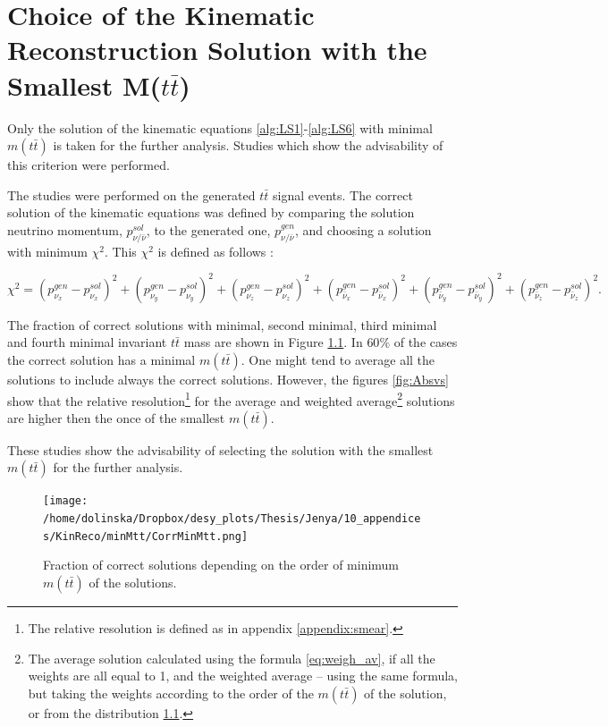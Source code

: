 \chapter{Choice of the Kinematic Reconstruction Solution with the Smallest M($t\bar{t}$)}\label{appendix:mtt}

Only the solution of the kinematic equations \ref{alg:LS1}-\ref{alg:LS6} with minimal $m(t\bar{t})$ is taken for the further analysis.
Studies which show the advisability of this criterion were performed.

The studies were performed on the generated $t\bar{t}$ signal events. The correct solution of the kinematic equations was defined by comparing the 
solution neutrino momentum, $p_{\nu/\bar{\nu}}^{sol}$, to the generated one, $p_{\nu/\bar{\nu}}^{gen}$,  and choosing a solution with minimum $\chi^{2}$.
This $\chi^{2}$ is defined as follows \cite{Sonnenschein:2005ed}:

\begin{equation}
 \chi^{2} = (p_{\nu_{x}}^{gen} - p_{\nu_{x}}^{sol})^{2} + (p_{\nu_{y}}^{gen} - p_{\nu_{y}}^{sol})^{2} + (p_{\nu_{z}}^{gen} - p_{\nu_{z}}^{sol})^{2} + (p_{\bar{\nu}_{x}}^{gen} - p_{\bar{\nu}_{x}}^{sol})^{2} +
 (p_{\bar{\nu}_{y}}^{gen} - p_{\bar{\nu}_{y}}^{sol})^{2} + (p_{\bar{\nu}_{z}}^{gen} - p_{\bar{\nu}_{z}}^{sol})^{2}.
\end{equation}

The fraction of correct solutions with minimal, second minimal, third minimal and fourth minimal invariant $t\bar{t}$ mass are shown in Figure \ref{fig:corrMinMtt}. In $60\%$ of 
the cases the correct solution has a minimal $m(t\bar{t})$. One might tend to average all the solutions to include always the correct solutions. However, the figures \ref{fig:Absvs}
show that the relative resolution\footnote{The relative resolution is defined as in appendix \ref{appendix:smear}.} for the average and weighted average\footnote{The average 
solution calculated using the formula \ref{eq:weigh_av}, if all the weights are all equal to 1, and the weighted average -- using the same formula, but taking the weights according 
to the order of the $m(t\bar{t})$ of the solution, or from the distribution \ref{fig:corrMinMtt}.} solutions are higher then the once
of the smallest $m(t\bar{t})$.

These studies show the advisability of selecting the
solution with the smallest $m(t\bar{t})$ for the further analysis.

\begin{figure}[t]
  \centering
  \texttt{[image: /home/dolinska/Dropbox/desy\_plots/Thesis/Jenya/10\_appendices/KinReco/minMtt/CorrMinMtt.png]}
  \caption{Fraction of correct solutions depending on the order of minimum $m(t\bar{t})$ of the solutions.}
  \label{fig:corrMinMtt}
\end{figure}

